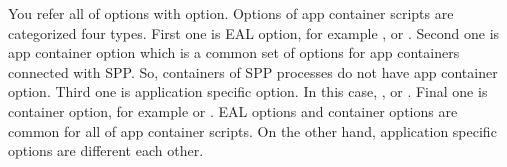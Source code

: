 \documentclass[a4paper,11pt,openany,oneside,english]{sphinxmanual}
\begin{document}
You refer all of options with  option.
Options of app container scripts are categorized four types.
First one is EAL option, for example ,  or .
Second one is app container option which is a common set of options for
app containers connected with SPP. So, containers of SPP processes do
not have app container option.
Third one is application specific option. In this case,
,  or .
Final one is container option, for example  or
.
EAL options and container options are common for all of app container
scripts.
On the other hand, application specific options are different each other.
\end{document}
